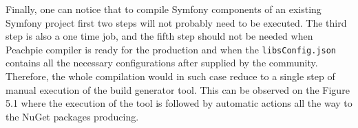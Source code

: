 Finally, one can notice that to compile Symfony components of an existing Symfony project first two steps will not probably need to be executed. The third step is also a one time job, and the fifth step should not be needed when Peachpie compiler is ready for the production and when the \texttt{libsConfig.json} contains all the necessary configurations after supplied by the community. Therefore, the whole compilation would in such case reduce to a single step of manual execution of the build generator tool. This can be observed on the Figure 5.1 where the execution of the tool is followed by automatic actions all the way to the NuGet packages producing.
